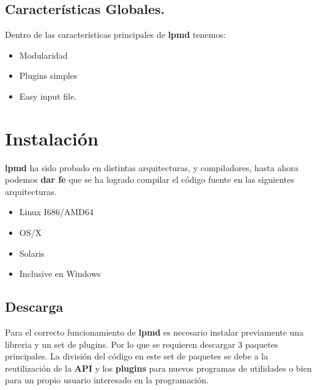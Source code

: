 \documentclass[a4paper,10pt]{scrbook}
\newcommand{\lpmd}{\textbf{lpmd }}
\begin{document}
\section{Caracter\'isticas Globales.}

Dentro de las caracter\'isticas principales de \lpmd tenemos:
\begin{itemize}
 \item Modularidad
 \item Plugins simples
 \item Easy input file.
\end{itemize}

\chapter{Instalaci\'on}
\label{chap:inst}

\lpmd ha sido probado en distintas arquitecturas, y compiladores, hasta ahora podemos \textbf{dar fe} que se ha logrado compilar el c\'odigo fuente en las siguientes arquitecturas.

\begin{itemize}
 \item Linux I686/AMD64
 \item OS/X
 \item Solaris
 \item Inclusive en Windows
\end{itemize}

\section{Descarga}

Para el correcto funcionamiento de \lpmd es necesario instalar previamente una libreria y un set de plugins. Por lo que se requieren descargar 3 paquetes principales. La divisi\'on del c\'odigo en este set de paquetes se debe a la reutilizaci\'on de la \textbf{API} y los \textbf{plugins} para nuevos programas de utilidades o bien para un propio usuario interesado en la programaci\'on.
\end{document}
